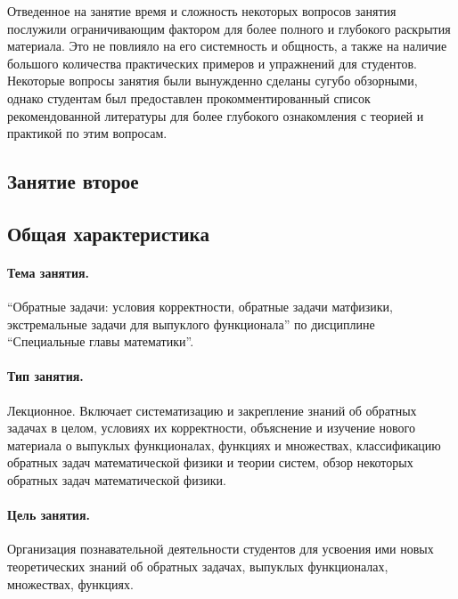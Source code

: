\begin{refsection}
    Отведенное на занятие время и сложность некоторых вопросов занятия послужили ограничивающим фактором для более полного и глубокого раскрытия материала. Это не повлияло на его системность и общность, а также на наличие большого количества практических примеров и упражнений для студентов. Некоторые вопросы занятия были вынужденно сделаны сугубо обзорными, однако студентам был предоставлен прокомментированный список рекомендованной литературы для более глубокого ознакомления с теорией и практикой по этим вопросам.

\nocite{*}\printbibliography[heading=lessonbib, keyword={lesson1}]

\end{refsection}

\begin{refsection}
\section{Занятие второе}

\subsection{Общая характеристика}

    \paragraph{Тема занятия.} \enquote{Обратные задачи: условия корректности, обратные задачи матфизики, экстремальные задачи для выпуклого функционала} по дисциплине \enquote{Специальные главы математики}.

    \paragraph{Тип занятия.} Лекционное. Включает систематизацию и закрепление знаний об обратных задачах в целом, условиях их корректности, объяснение и изучение нового материала о выпуклых функционалах, функциях и множествах, классификацию обратных задач математической физики и теории систем, обзор некоторых обратных задач математической физики.

    \paragraph{Цель занятия.} Организация познавательной деятельности студентов для усвоения ими новых теоретических знаний об обратных задачах, выпуклых функционалах, множествах, функциях.


\end{refsection}
